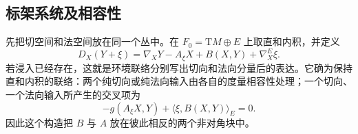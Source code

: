 \subsection{标架系统及相容性}
\label{g3:subsec:0403:02}

先把切空间和法空间放在同一个丛中。在 \(F_0=\mathrm TM\oplus E\) 上取直和内积，并定义
\begin{equation}\label{g3:eq:submanifold-data-connection}
	D_X(Y+\xi)
	=\nabla_XY-A_\xi X+B(X,Y)+\nabla^E_X\xi.
\end{equation}
若浸入已经存在，这就是环境联络分别写出切向和法向分量后的表达。它确为保持直和内积的联络：两个纯切向或纯法向输入由各自的度量相容性处理；一个切向、一个法向输入所产生的交叉项为
\[
	-g(A_\xi X,Y)+\langle\xi,B(X,Y)\rangle_E=0.
\]
因此这个构造把 \(B\) 与 \(A\) 放在彼此相反的两个非对角块中。

